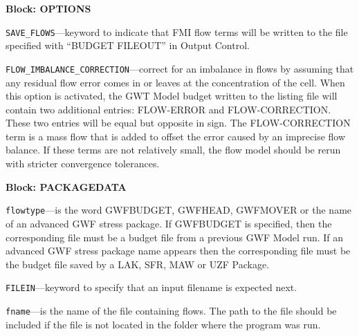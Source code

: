 
\item \textbf{Block: OPTIONS}

\begin{description}
\item \texttt{SAVE\_FLOWS}---keyword to indicate that FMI flow terms will be written to the file specified with ``BUDGET FILEOUT'' in Output Control.

\item \texttt{FLOW\_IMBALANCE\_CORRECTION}---correct for an imbalance in flows by assuming that any residual flow error comes in or leaves at the concentration of the cell.  When this option is activated, the GWT Model budget written to the listing file will contain two additional entries: FLOW-ERROR and FLOW-CORRECTION.  These two entries will be equal but opposite in sign.  The FLOW-CORRECTION term is a mass flow that is added to offset the error caused by an imprecise flow balance.  If these terms are not relatively small, the flow model should be rerun with stricter convergence tolerances.

\end{description}
\item \textbf{Block: PACKAGEDATA}

\begin{description}
\item \texttt{flowtype}---is the word GWFBUDGET, GWFHEAD, GWFMOVER or the name of an advanced GWF stress package.  If GWFBUDGET is specified, then the corresponding file must be a budget file from a previous GWF Model run.  If an advanced GWF stress package name appears then the corresponding file must be the budget file saved by a LAK, SFR, MAW or UZF Package.

\item \texttt{FILEIN}---keyword to specify that an input filename is expected next.

\item \texttt{fname}---is the name of the file containing flows.  The path to the file should be included if the file is not located in the folder where the program was run.

\end{description}

